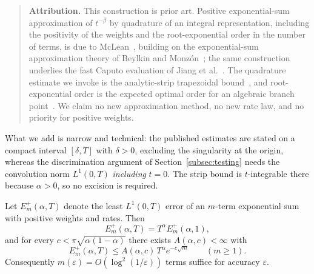 \begin{quote}
\textbf{Attribution.} This construction is prior art. Positive exponential-sum approximation of $t^{-\beta}$ by quadrature of an integral representation, including the positivity of the weights and the root-exponential order in the number of terms, is due to McLean~\cite{K07}, building on the exponential-sum approximation theory of Beylkin and Monz\'on~\cite{K03,K04}; the same construction underlies the fast Caputo evaluation of Jiang et al.~\cite{K05}. The quadrature estimate we invoke is the analytic-strip trapezoidal bound~\cite{K08}, and root-exponential order is the expected optimal order for an algebraic branch point~\cite{K09}. We claim no new approximation method, no new rate law, and no priority for positive weights.
\end{quote}

What we add is narrow and technical: the published estimates are stated on a compact interval $[\delta,T]$ with $\delta>0$, excluding the singularity at the origin, whereas the discrimination argument of Section~\ref{subsec:testing} needs the convolution norm $L^1(0,T)$ \emph{including} $t=0$. The strip bound is $t$-integrable there because $\alpha>0$, so no excision is required.

\begin{lemma}
\label{lem:soe}
Let $E_m^+(\alpha,T)$ denote the least $L^1(0,T)$ error of an $m$-term exponential sum with positive weights and rates. Then
\begin{equation}
E_m^+(\alpha,T)=T^\alpha E_m^+(\alpha,1),
\label{eq:scaling}
\end{equation}
and for every $c<\pi\sqrt{\alpha(1-\alpha)}$ there exists $A(\alpha,c)<\infty$ with
\begin{equation}
E_m^+(\alpha,T)\le A(\alpha,c)\,T^\alpha e^{-c\sqrt m}\qquad(m\ge1).
\label{eq:rootexp}
\end{equation}
Consequently $m(\varepsilon)=O(\log^2(1/\varepsilon))$ terms suffice for accuracy $\varepsilon$.
\end{lemma}

